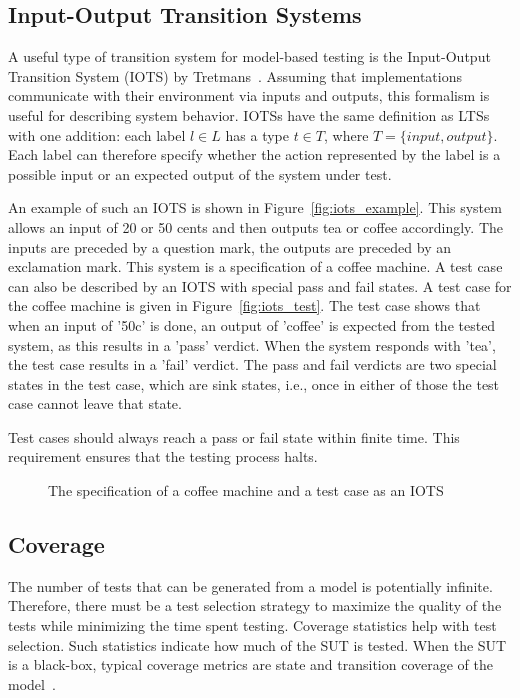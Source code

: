 \subsection{Input-Output Transition Systems}
A useful type of transition system for model-based testing is the Input-Output Transition System (IOTS) by Tretmans~\cite{Tretmans:testgeneration}. Assuming that implementations communicate with their environment via inputs and outputs, this formalism is useful for describing system behavior. IOTSs have the same definition as LTSs with one addition: each label $l \in L$ has a type $t \in T$, where $T = \{input, output\}$. Each label can therefore specify whether the action represented by the label is a possible input or an expected output of the system under test.

An example of such an IOTS is shown in Figure~\ref{fig:iots_example}. This system allows an input of 20 or 50 cents and then outputs tea or coffee accordingly. The inputs are preceded by a question mark, the outputs are preceded by an exclamation mark. This system is a specification of a coffee machine. A test case can also be described by an IOTS with special pass and fail states. A test case for the coffee machine is given in Figure~\ref{fig:iots_test}. The test case shows that when an input of '50c' is done, an output of 'coffee' is expected from the tested system, as this results in a 'pass' verdict. When the system responds with 'tea', the test case results in a 'fail' verdict. The pass and fail verdicts are two special states in the test case, which are sink states, i.e., once in either of those the test case cannot leave that state. 

Test cases should always reach a pass or fail state within finite time. This requirement ensures that the testing process halts.
\begin{figure}[ht]
  \begin{center}
    \subfloat[An IOTS]{\label{fig:iots_example}}
  \end{center}
  \caption{The specification of a coffee machine and a test case as an IOTS}
\end{figure}

\subsection{Coverage}\label{sec:coverage}
The number of tests that can be generated from a model is potentially infinite. Therefore, there must be a test selection strategy to maximize the quality of the tests while minimizing the time spent testing. Coverage statistics help with test selection. Such statistics indicate how much of the SUT is tested. When the SUT is a black-box, typical coverage metrics are state and transition coverage of the model~\cite{Lee:testing, Nachmanson:testing, Hasan:testing}.


